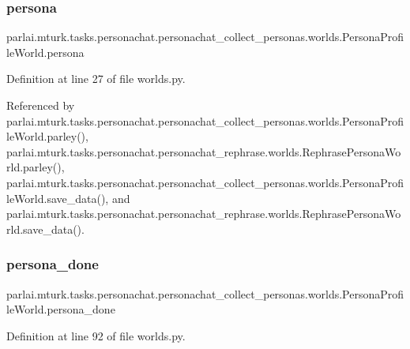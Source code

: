 \subsubsection{\texorpdfstring{persona}{persona}}
{\footnotesize\ttfamily parlai.\+mturk.\+tasks.\+personachat.\+personachat\+\_\+collect\+\_\+personas.\+worlds.\+Persona\+Profile\+World.\+persona}



Definition at line 27 of file worlds.\+py.



Referenced by parlai.\+mturk.\+tasks.\+personachat.\+personachat\+\_\+collect\+\_\+personas.\+worlds.\+Persona\+Profile\+World.\+parley(), parlai.\+mturk.\+tasks.\+personachat.\+personachat\+\_\+rephrase.\+worlds.\+Rephrase\+Persona\+World.\+parley(), parlai.\+mturk.\+tasks.\+personachat.\+personachat\+\_\+collect\+\_\+personas.\+worlds.\+Persona\+Profile\+World.\+save\+\_\+data(), and parlai.\+mturk.\+tasks.\+personachat.\+personachat\+\_\+rephrase.\+worlds.\+Rephrase\+Persona\+World.\+save\+\_\+data().

\mbox{\label{classparlai_1_1mturk_1_1tasks_1_1personachat_1_1personachat__collect__personas_1_1worlds_1_1PersonaProfileWorld_a64146427708eb1b226fea0da11ab21e7}} 
\subsubsection{\texorpdfstring{persona\+\_\+done}{persona\_done}}
{\footnotesize\ttfamily parlai.\+mturk.\+tasks.\+personachat.\+personachat\+\_\+collect\+\_\+personas.\+worlds.\+Persona\+Profile\+World.\+persona\+\_\+done}



Definition at line 92 of file worlds.\+py.



